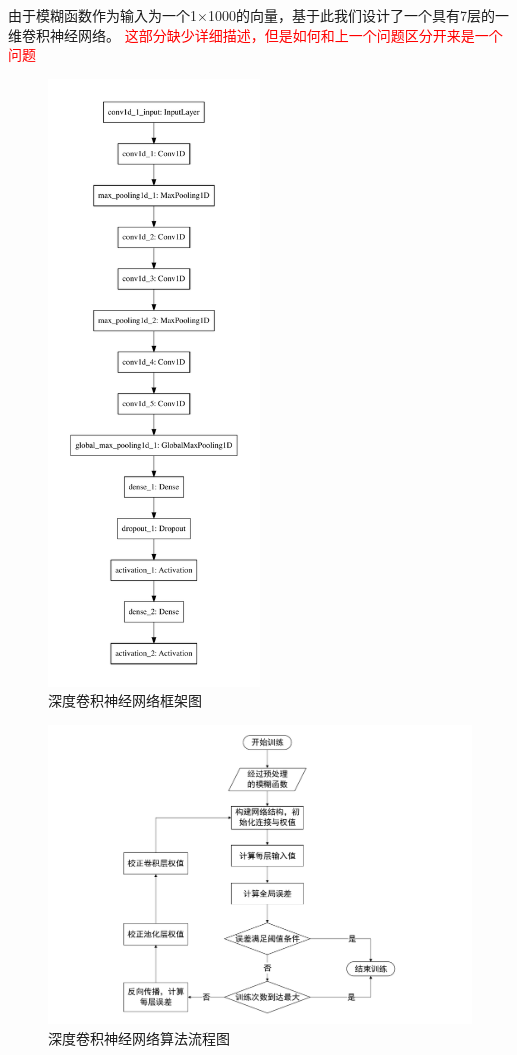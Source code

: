 由于模糊函数作为输入为一个1×1000的向量，基于此我们设计了一个具有7层的一维卷积神经网络。
\textcolor{red}{这部分缺少详细描述，但是如何和上一个问题区分开来是一个问题}

\begin{figure}
	\centering
	\includegraphics[width=0.5\textwidth]{figures/cnn.pdf}
	\caption{深度卷积神经网络框架图}
\end{figure}

\begin{figure}
	\centering
	\includegraphics[width=\textwidth]{figures/cnn_flow.pdf}
	\caption{深度卷积神经网络算法流程图}
\end{figure}


